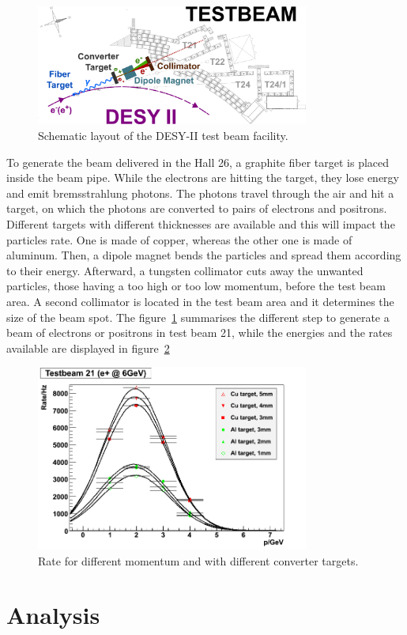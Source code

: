     \begin{figure}[!h]
      \centering
      \includegraphics[width = 0.8\textwidth]{Pictures/X0/desy_tb-sketch.png}
      \caption{Schematic layout of the DESY-II test beam facility\cite{DESYII}.}
      \label{fig:desyTb-sketch}
    \end{figure}

    To generate the beam delivered in the Hall 26, a graphite fiber target is placed inside the beam pipe.
    While the electrons are hitting the target, they lose energy and emit bremsstrahlung photons.
    The photons travel through the air and hit a target, on which the photons are converted to pairs of electrons and positrons.
    Different targets with different thicknesses are available and this will impact the particles rate.
    One is made of copper, whereas the other one is made of aluminum.
    Then, a dipole magnet bends the particles and spread them according to their energy.
    Afterward, a tungsten collimator cuts away the unwanted particles, those having a too high or too low momentum, before the test beam area.
    A second collimator is located in the test beam area and it determines the size of the beam spot.
    The figure~\ref{fig:desyTb-sketch} summarises the different step to generate a beam of electrons or positrons in test beam 21, while the energies and the rates available are displayed in figure~\ref{fig:rateTB21}

    \begin{figure}[!h]
      \centering
      \includegraphics[width = 0.8\textwidth]{Pictures/X0/rate_vs_p_t21.png}
      \caption{Rate for different momentum and with different converter targets\cite{DESYII}.}
      \label{fig:rateTB21}
    \end{figure}


  \section{Analysis}
